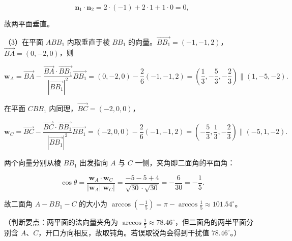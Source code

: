 \begin{answer}
\nopagebreak[4]
\[\boldsymbol n_1\cdot\boldsymbol n_2=2\cdot(-1)+2\cdot1+1\cdot0=0,\]

故两平面垂直。

（3）在平面 $ABB_1$ 内取垂直于棱 $BB_1$ 的向量。$\overrightarrow{BB_1}=(-1,-1,2)$，$\overrightarrow{BA}=(0,-2,0)$，则

\nopagebreak[4]
\[\boldsymbol w_A=\overrightarrow{BA}-\frac{\overrightarrow{BA}\cdot\overrightarrow{BB_1}}{|\overrightarrow{BB_1}|^2}\overrightarrow{BB_1}=(0,-2,0)-\frac{2}{6}(-1,-1,2)=\left(\frac13,-\frac53,-\frac23\right)\parallel(1,-5,-2).\]

在平面 $CBB_1$ 内同理，$\overrightarrow{BC}=(-2,0,0)$，

\nopagebreak[4]
\[\boldsymbol w_C=\overrightarrow{BC}-\frac{\overrightarrow{BC}\cdot\overrightarrow{BB_1}}{|\overrightarrow{BB_1}|^2}\overrightarrow{BB_1}=(-2,0,0)-\frac{2}{6}(-1,-1,2)=\left(-\frac53,\frac13,-\frac23\right)\parallel(-5,1,-2).\]

两个向量分别从棱 $BB_1$ 出发指向 $A$ 与 $C$ 一侧，夹角即二面角的平面角：

\nopagebreak[4]
\[\cos\theta=\frac{\boldsymbol w_A\cdot\boldsymbol w_C}{|\boldsymbol w_A||\boldsymbol w_C|}=\frac{-5-5+4}{\sqrt{30}\cdot\sqrt{30}}=-\frac{6}{30}=-\frac15.\]

故二面角 $A-BB_1-C$ 的大小为 $\arccos\left(-\frac15\right)=\pi-\arccos\frac15\approx101.54^\circ$。

（判断要点：两平面的法向量夹角为 $\arccos\frac15\approx78.46^\circ$，但二面角的两半平面分别含 $A$、$C$，开口方向相反，故取钝角。若误取锐角会得到干扰值 $78.46^\circ$。）


\end{answer}
